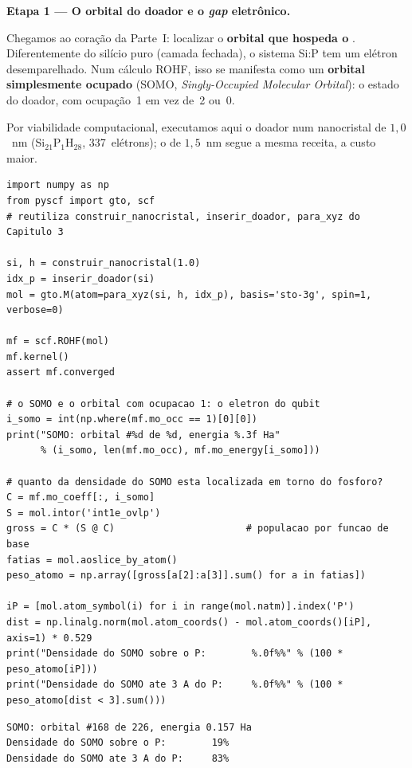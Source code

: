 \begin{caixaancora}
\textbf{Etapa 1 --- O orbital do doador e o \emph{gap} eletrônico.}

Chegamos ao coração da Parte~I: localizar o \textbf{orbital que hospeda o
\qubit{}}. Diferentemente do silício puro (camada fechada), o sistema Si:P tem um
elétron desemparelhado. Num cálculo ROHF, isso se manifesta como um
\textbf{orbital simplesmente ocupado} (SOMO, \emph{Singly-Occupied Molecular
Orbital}): o estado do doador, com ocupação~1 em vez de~2 ou~0.

\vspace{0.2cm}
Por viabilidade computacional, executamos aqui o doador num nanocristal de
$1{,}0$~nm (Si$_{21}$P$_1$H$_{28}$, 337~elétrons); o de $1{,}5$~nm segue a mesma
receita, a custo maior.

\begin{lstlisting}[style=python]
import numpy as np
from pyscf import gto, scf
# reutiliza construir_nanocristal, inserir_doador, para_xyz do Capitulo 3

si, h = construir_nanocristal(1.0)
idx_p = inserir_doador(si)
mol = gto.M(atom=para_xyz(si, h, idx_p), basis='sto-3g', spin=1, verbose=0)

mf = scf.ROHF(mol)
mf.kernel()
assert mf.converged

# o SOMO e o orbital com ocupacao 1: o eletron do qubit
i_somo = int(np.where(mf.mo_occ == 1)[0][0])
print("SOMO: orbital #%d de %d, energia %.3f Ha"
      % (i_somo, len(mf.mo_occ), mf.mo_energy[i_somo]))

# quanto da densidade do SOMO esta localizada em torno do fosforo?
C = mf.mo_coeff[:, i_somo]
S = mol.intor('int1e_ovlp')
gross = C * (S @ C)                       # populacao por funcao de base
fatias = mol.aoslice_by_atom()
peso_atomo = np.array([gross[a[2]:a[3]].sum() for a in fatias])

iP = [mol.atom_symbol(i) for i in range(mol.natm)].index('P')
dist = np.linalg.norm(mol.atom_coords() - mol.atom_coords()[iP], axis=1) * 0.529
print("Densidade do SOMO sobre o P:        %.0f%%" % (100 * peso_atomo[iP]))
print("Densidade do SOMO ate 3 A do P:     %.0f%%" % (100 * peso_atomo[dist < 3].sum()))
\end{lstlisting}

\begin{lstlisting}[style=console]
SOMO: orbital #168 de 226, energia 0.157 Ha
Densidade do SOMO sobre o P:        19%
Densidade do SOMO ate 3 A do P:     83%
\end{lstlisting}


\end{caixaancora}
